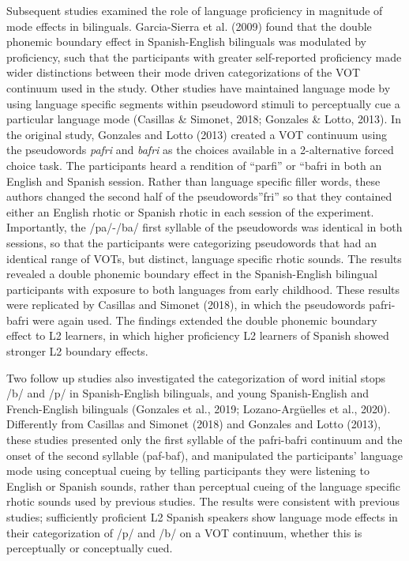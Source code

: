 \documentclass[
  man,floatsintext]{apa6}
\begin{document}
Subsequent studies examined the role of language proficiency in magnitude of mode effects in bilinguals.
Garcia-Sierra et al. (2009) found that the double phonemic boundary effect in Spanish-English bilinguals was modulated by proficiency, such that the participants with greater self-reported proficiency made wider distinctions between their mode driven categorizations of the VOT continuum used in the study.
Other studies have maintained language mode by using language specific segments within pseudoword stimuli to perceptually cue a particular language mode (Casillas \& Simonet, 2018; Gonzales \& Lotto, 2013). In the original study, Gonzales and Lotto (2013) created a VOT continuum using the pseudowords \emph{pafri} and \emph{bafri} as the choices available in a 2-alternative forced choice task.
The participants heard a rendition of ``parfi'' or ``bafri in both an English and Spanish session.
Rather than language specific filler words, these authors changed the second half of the pseudowords''fri'' so that they contained either an English rhotic or Spanish rhotic in each session of the experiment.
Importantly, the /pa/-/ba/ first syllable of the pseudowords was identical in both sessions, so that the participants were categorizing pseudowords that had an identical range of VOTs, but distinct, language specific rhotic sounds.
The results revealed a double phonemic boundary effect in the Spanish-English bilingual participants with exposure to both languages from early childhood. These results were replicated by Casillas and Simonet (2018), in which the pseudowords pafri-bafri were again used.
The findings extended the double phonemic boundary effect to L2 learners, in which higher proficiency L2 learners of Spanish showed stronger L2 boundary effects.

Two follow up studies also investigated the categorization of word initial stops /b/ and /p/ in Spanish-English bilinguals, and young Spanish-English and French-English bilinguals (Gonzales et al., 2019; Lozano-Argüelles et al., 2020).
Differently from Casillas and Simonet (2018) and Gonzales and Lotto (2013), these studies presented only the first syllable of the pafri-bafri continuum and the onset of the second syllable (paf-baf), and manipulated the participants' language mode using conceptual cueing by telling participants they were listening to English or Spanish sounds, rather than perceptual cueing of the language specific rhotic sounds used by previous studies.
The results were consistent with previous studies; sufficiently proficient L2 Spanish speakers show language mode effects in their categorization of /p/ and /b/ on a VOT continuum, whether this is perceptually or conceptually cued.
\end{document}
